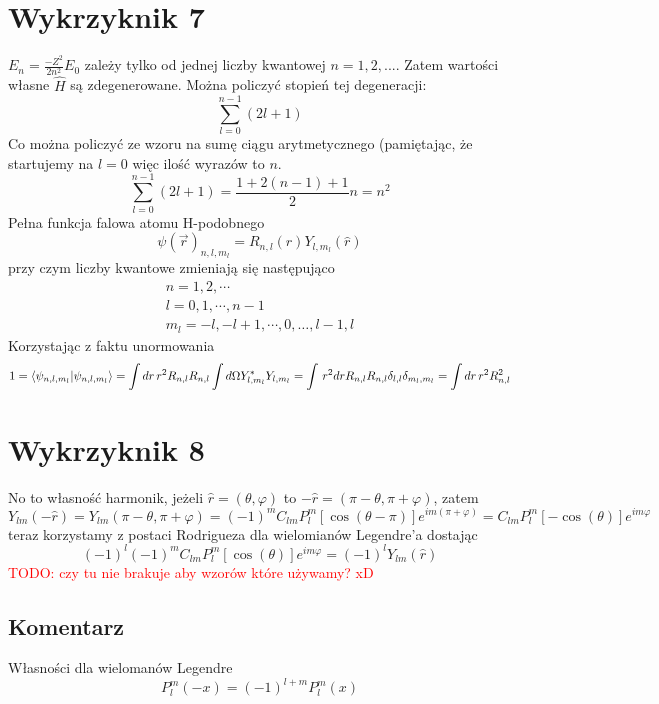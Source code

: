 \documentclass[a4paper,12pt]{article}
\newcommand\myworries[1]{\textcolor{red}{#1}} %
\begin{document}
\section{Wykrzyknik 7}
$E_n = \frac{-Z^2}{2n^2}E_0$ zależy tylko od jednej liczby kwantowej $n=1, 2,
...$. Zatem wartości własne $\hat{H}$ są zdegenerowane.
Można policzyć stopień tej degeneracji:
\[
  \sum^{n-1}_{l=0} (2l+1) 
\]
Co można policzyć ze wzoru na sumę ciągu arytmetycznego (pamiętając, że
startujemy na $l=0$ więc ilość wyrazów to $n$.
\[
  \sum^{n-1}_{l=0} (2l+1) = \frac{1+2(n-1) + 1}{2}n = n^2
\]
Pełna funkcja falowa atomu H-podobnego
$$
\psi(\vec{r})_{n,l,m_l} = R_{n,l}(r) Y_{l,m_l}(\hat{r})
$$
przy czym liczby kwantowe zmieniają się następująco
$$
\begin{gathered}
n = 1,2,\cdots\\
l = 0,1,\cdots,n-1\\
m_l = -l,-l+1,\cdots,0,\dots,l-1,l
\end{gathered}
$$
Korzystając z faktu unormowania
$$
\begin{gathered}
1=\bra{\psi_{n,l,m_l}}\ket{\psi_{n,l,m_l}} = \int dr\, r^2 R_{n,l}R_{n,l} \int d\Omega Y^*_{l,m_l}Y_{l,m_l} =  \int\, r^2 dr R_{n,l}R_{n,l} \delta_{l,l}\delta_{m_l,m_l} = \int dr \, r^2 R_{n,l}^2
\end{gathered}
$$
\section{Wykrzyknik 8}
No to własność harmonik, jeżeli $\hat{r} = (\theta,\varphi)$ to $-\hat{r} = (\pi-\theta,\pi+\varphi)$, zatem
$$
	Y_{lm}(-\hat{r}) = Y_{lm}(\pi-\theta,\pi+\varphi) = (-1)^m C_{lm} P^m_l[\cos(\theta-\pi)]e^{im(\pi+\varphi)} = C_{lm} P^m_l[-\cos(\theta)]e^{im\varphi}
$$
teraz korzystamy z postaci Rodrigueza dla wielomianów Legendre'a dostając
$$
	(-1)^l (-1)^m C_{lm} P^m_l[\cos(\theta)]e^{im\varphi} = (-1)^l Y_{lm}(\hat{r})
$$
\myworries{TODO: czy tu nie brakuje aby wzorów które używamy? xD}

\subsection{Komentarz}
	Własności dla wielomanów Legendre
	$$
		P_l^m (-x) = (-1)^{l+m} P_l^m(x)
	$$
\end{document}
